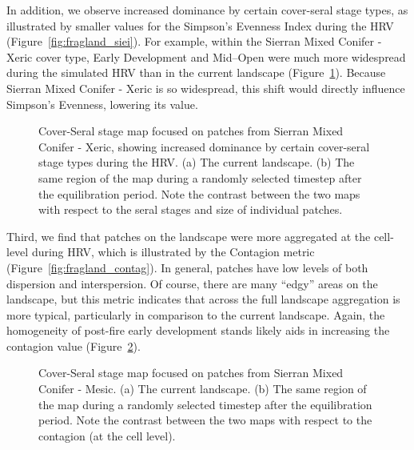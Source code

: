 
In addition, we observe increased dominance by certain cover-seral stage types, as illustrated by smaller values for the Simpson's Evenness Index during the HRV (Figure~\ref{fig:fragland_siei}). For example, within the Sierran Mixed Conifer - Xeric cover type, Early Development and Mid--Open were much more widespread during the simulated HRV than in the current landscape (Figure~\ref{fig:patchmaps2}). Because Sierran Mixed Conifer - Xeric is so widespread, this shift would directly influence Simpson's Evenness, lowering its value.

\begin{figure}[!htbp]
  \centering
  \caption{Cover-Seral stage map focused on patches from Sierran Mixed Conifer - Xeric, showing increased dominance by certain cover-seral stage types during the HRV. (a) The current landscape. (b) The same region of the map during a randomly selected timestep after the equilibration period. Note the contrast between the two maps with respect to the seral stages and size of individual patches.} 
  \label{fig:patchmaps2}
\end{figure}


Third, we find that patches on the landscape were more aggregated at the cell-level during HRV, which is illustrated by the Contagion metric (Figure~\ref{fig:fragland_contag}). In general, patches have low levels of both dispersion and interspersion. Of course, there are many ``edgy'' areas on the landscape, but this metric indicates that across the full landscape aggregation is more typical, particularly in comparison to the current landscape. Again, the homogeneity of post-fire early development stands likely aids in increasing the contagion value (Figure~\ref{fig:patchmaps3}). 

\begin{figure}[!htbp]
  \centering
  \caption{Cover-Seral stage map focused on patches from Sierran Mixed Conifer - Mesic. (a) The current landscape. (b) The same region of the map during a randomly selected timestep after the equilibration period. Note the contrast between the two maps with respect to the contagion (at the cell level).} 
  \label{fig:patchmaps3} %
\end{figure}

